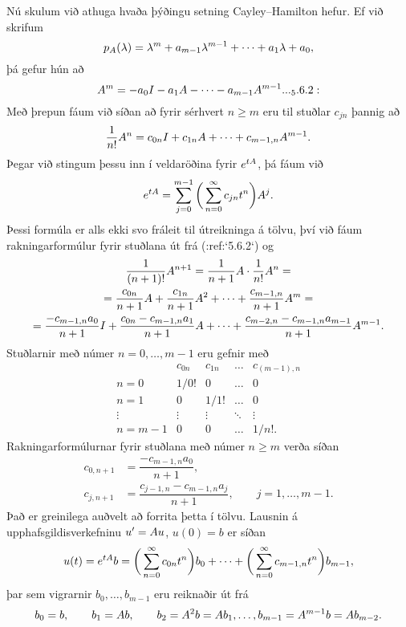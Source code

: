 Nú skulum við athuga hvaða þýðingu setning Cayley--Hamilton hefur.
Ef við skrifum 
 $$p_A(\lambda)=\lambda\sp
m+a_{m-1}\lambda\sp{m-1}+\cdots+a_1\lambda+a_0,
 $$
þá gefur hún að 
 \begin{equation*}A\sp m=-a_0I-a_1A-\cdots-a_{m-1}A\sp {m-1}. 

.. _5.6.2:

 \end{equation*}
Með þrepun fáum við síðan að fyrir sérhvert $n\geq m$ eru til stuðlar
$c_{jn}$ þannig að 
 $$\dfrac 1{n!}A\sp n=
c_{0n}I+c_{1n}A+\cdots+c_{m-1,n}A\sp{m-1}.
 $$
Þegar við stingum þessu inn í veldaröðina fyrir $e\sp{tA}$, þá fáum við
 $$e\sp {tA}= \sum_{j=0}\sp {m-1}\bigg(
\sum_{n=0}\sp\infty c_{jn}t\sp n\bigg)A\sp j.
 $$
Þessi formúla er alls ekki svo fráleit til útreikninga á tölvu, því
við fáum rakningarformúlur fyrir stuðlana út frá (:ref:`5.6.2`) og
\begin{multline*}
\dfrac 1{(n+1)!}A\sp{n+1} =\dfrac 1{n+1}A\cdot\dfrac 1{n!}A\sp n=\\
=\dfrac{c_{0n}}{n+1}A+\dfrac{c_{1n}}{n+1}A\sp 2+\cdots
+\dfrac{c_{m-1,n}}{n+1}A\sp m=\\
=\dfrac{-c_{m-1,n}a_0}{n+1}I+\dfrac{c_{0n}-c_{m-1,n}a_1}{n+1}A+
\cdots+\dfrac{c_{m-2,n}-c_{m-1,n}a_{m-1}}{n+1}A\sp{m-1}.
\end{multline*}
Stuðlarnir með númer $n=0,\dots,m-1$ eru gefnir með 
 $$\begin{matrix}
 & c_{0n}& c_{1n}&\dots&c_{(m-1),n}\\
n=0&1/0!&0&\dots&0\\
n=1&0&1/1!&\dots&0\\
\vdots&\vdots&\vdots&\ddots&\vdots\\
n=m-1&0&0&\dots&1/n!.
\end{matrix}
 $$
Rakningarformúlurnar fyrir stuðlana með númer $n\geq m$ verða síðan
\begin{align*}
c_{0,n+1}&= \dfrac{-c_{m-1,n}a_0}{n+1},\\
c_{j,n+1}&= \dfrac{c_{j-1,n}-c_{m-1,n}a_j}{n+1}, 
\qquad j=1,\dots,m-1.
\end{align*}
Það  er greinilega auðvelt að forrita þetta í tölvu.
Lausnin á upphafsgildisverkefninu $u{\sp{\prime}}=Au$, $u(0)=b$ er síðan
 $$u(t) =e\sp{tA}b = 
\bigg( \sum_{n=0}\sp\infty c_{0n}t\sp n\bigg) b_0+\cdots+
\bigg( \sum_{n=0}\sp \infty c_{m-1,n}t\sp n\bigg) b_{m-1},
 $$
þar sem vigrarnir $b_0,\dots, b_{m-1}$ eru reiknaðir út frá
 $$
b_0=b, \qquad b_1=Ab, \qquad b_2=A\sp 2b=Ab_1, \dots,
b_{m-1}=A\sp{m-1}b=Ab_{m-2}.
 $$



